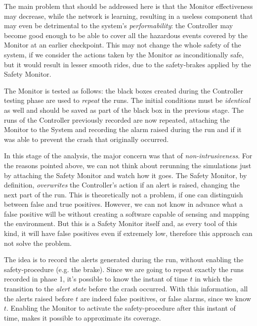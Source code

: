 The main problem that should be addressed here is that the Monitor effectiveness may decrease, while the network is learning, resulting in a useless component that may even be detrimental to the system's \textsl{performability}: the Controller may become good enough to be able to cover all the hazardous events covered by the Monitor at an earlier checkpoint. This may not change the whole safety of the system, if we consider the actions taken by the Monitor as inconditionally safe, but it would result in lesser smooth rides, due to the safety-brakes applied by the Safety Monitor.\newline

The Monitor is tested as follows: the black boxes created during the Controller testing phase are used to \textsl{repeat} the runs. The initial conditions must be \textsl{identical} as well and should be saved as part of the black box in the previous stage. The runs of the Controller previously recorded are now repeated, attaching the Monitor to the System and recording the alarm raised during the run and if it was able to prevent the crash that originally occurred.

In this stage of the analysis, the major concern was that of \textsl{non-intrusiveness}. For the reasons pointed above, we can not think about rerunning the simulations just by attaching the Safety Monitor and watch how it goes. The Safety Monitor, by definition, \textsl{overwrites} the Controller's action if an alert is raised, changing the next part of the run. This is theoretically not a problem, if one can distinguish between false and true positives. However, we can not know in advance what a false positive will be without creating a software capable of sensing and mapping the environment. But this is a Safety Monitor itself and, as every tool of this kind, it will have false positives even if extremely low, therefore this approach can not solve the problem.

The idea is to record the alerts generated during the run, without enabling the safety-procedure (e.g. the brake). Since we are going to repeat exactly the runs recorded in phase 1, it's possible to know the instant of time $t$ in which the transition to the \textsl{alert state} before the crash occurred. With this information, all the alerts raised before $t$ are indeed false positives, or false alarms, since we know $t$. Enabling the Monitor to activate the safety-procedure after this instant of time, makes it possible to approximate its coverage. 

